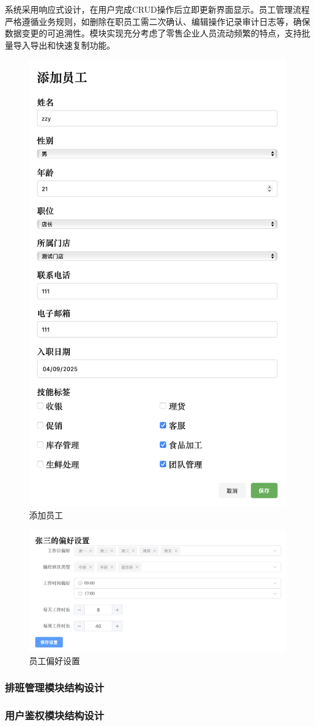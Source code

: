 \documentclass{ctexart}
\begin{document}
系统采用响应式设计，在用户完成CRUD操作后立即更新界面显示。员工管理流程严格遵循业务规则，如删除在职员工需二次确认、编辑操作记录审计日志等，确保数据变更的可追溯性。模块实现充分考虑了零售企业人员流动频繁的特点，支持批量导入导出和快速复制功能。
\begin{figure}[H]
    \centering
    \includegraphics[width=0.3\linewidth]{./source/添加员工.png}
    \caption{添加员工}
\end{figure} 
\begin{figure}[H]
    \centering
    \includegraphics[width=0.5\linewidth]{./source/员工偏好设置.png}
    \caption{员工偏好设置}
\end{figure}

\subsubsection{排班管理模块结构设计}
\subsubsection{用户鉴权模块结构设计}
\end{document}
